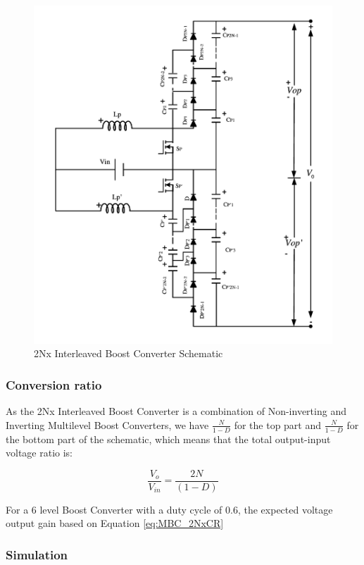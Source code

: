 \begin{figure}[H]
   \centering
   \includegraphics[width=\textwidth]{figures/yMultilevel/2Nx_full.pdf}
    \caption{2Nx Interleaved Boost Converter Schematic}
	\label{fig:MBC_2NxSchematic}
\end{figure}

\subsubsection{Conversion ratio}

As the 2Nx Interleaved Boost Converter is a combination of Non-inverting and Inverting Multilevel Boost Converters, we have $\frac{N}{1-D}$ for the top part and $\frac{N}{1-D}$ for the bottom part of the schematic, which means that the total output-input voltage ratio is:

\begin{equation}
	\frac{V_o}{V_{in}} = \frac{2N}{(1-D)}
	\label{eq:MBC_2NxCR}
\end{equation}



For a 6 level Boost Converter with a duty cycle of 0.6, the expected voltage output gain based on Equation \ref{eq:MBC_2NxCR} \subsubsection{Simulation}

